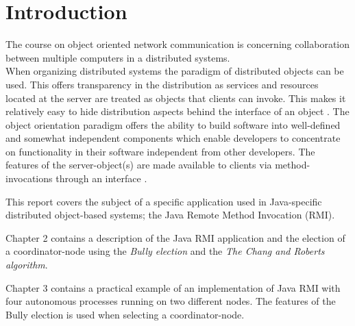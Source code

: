 \documentclass[Main]{subfiles}
\begin{document}
\chapter{Introduction}
The course on object oriented network communication is concerning collaboration between multiple computers in a distributed systems.\\
When organizing distributed systems the paradigm of distributed objects can be used. This offers transparency in the distribution as services and resources located at the server are treated as objects that clients can invoke. This makes it relatively easy to hide distribution aspects behind the interface of an object \cite[p. 443]{Tanenbaum}. The object orientation paradigm offers the ability to build software into well-defined and somewhat independent components which enable developers to concentrate on functionality in their software independent from other developers. The features of the server-object(s) are made available to clients via method-invocations through an interface \cite[p. 443-444]{Tanenbaum}.


This report covers the subject of a specific application used in Java-specific distributed object-based systems; the Java Remote Method Invocation (RMI).


Chapter 2 contains a description of the Java RMI application and the election of a coordinator-node using the \textit{Bully election} and the \textit{The Chang and Roberts algorithm}.


Chapter 3 contains a practical example of an implementation of Java RMI with four autonomous processes running on two different nodes. The features of the Bully election is used when selecting a coordinator-node.
\end{document}
